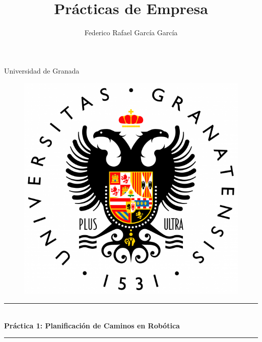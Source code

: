 \documentclass[11pt,spanish]{article} %
\title{Prácticas de Empresa\vspace{1cm}}
\author{Federico Rafael García García}
\begin{document}
\abovedisplayshortskip=0pt
\belowdisplayshortskip=0.5cm
\abovedisplayskip=0.5cm
\belowdisplayskip=0pt


\begin{titlepage}

\newcommand{\HRule}{\rule{\linewidth}{0.5mm}} %

\center %

\LARGE Universidad de Granada\\[1.7cm] %

\begin{figure}[H]
  \begin{center}
  \includegraphics[scale=.2]{logo}
  \end{center}
\end{figure}

\HRule \\[0.5cm]
{ \LARGE \bfseries Práctica 1: Planificación de Caminos en Robótica}\\[0.1cm] %
\HRule \\[1.5cm]


\end{titlepage}
\end{document}
